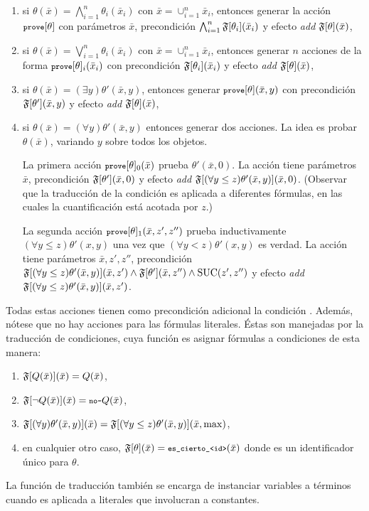 \begin{enumerate}[--]
\item si $\theta(\bar x)=\bigwedge_{i=1}^n \theta_i(\bar x_i)$
  con $\bar x=\cup_{i=1}^n \bar x_i$, entonces generar la acción
  ${\texttt{\footnotesize prove}}[\theta]$ con parámetros $\bar x$, precondición
  $\bigwedge_{i=1}^n \mathfrak{F}[\theta_i](\bar x_i)$ y efecto \textit{add}
  $\mathfrak{F}[\theta](\bar x)$,
%
\item si $\theta(\bar x)=\bigvee_{i=1}^n \theta_i(\bar x_i)$ con
  $\bar x=\cup_{i=1}^n \bar x_i$, entonces generar $n$ acciones de la forma
  ${\texttt{\footnotesize prove}}[\theta]_i(\bar x_i)$ con precondición
  $\mathfrak{F}[\theta_i](\bar x_i)$ y efecto \textit{add} $\mathfrak{F}[\theta](\bar x)$,
%
\item si $\theta(\bar x)=(\exists y)\theta'(\bar x,y)$, entonces generar
  ${\texttt{\footnotesize prove}}[\theta](\bar x,y)$ con precondición $\mathfrak{F}[\theta'](\bar x,y)$
  y efecto \textit{add} $\mathfrak{F}[\theta](\bar x)$,
%
\item si $\theta(\bar x)=(\forall y)\theta'(\bar x,y)$ entonces generar
  dos acciones. La idea es probar $\theta(\bar x)$, variando $y$
  sobre todos los objetos.

  La primera acción ${\texttt{\footnotesize prove}}[\theta]_0(\bar x)$ prueba $\theta'(\bar x,0)$.
  La acción tiene parámetros $\bar x$, precondición $\mathfrak{F}[\theta'](\bar x,0)$
  y efecto \textit{add} $\mathfrak{F}[(\forall y\leq z)\theta'(\bar x,y)](\bar x,0)$.
  (Observar que la traducción de la condición es aplicada a diferentes
fórmulas,
  en las cuales la cuantificación está acotada por $z$.)

  La segunda acción ${\texttt{\footnotesize prove}}[\theta]_1(\bar x,z',z'')$ prueba inductivamente
  $(\forall y\leq z)\theta'(x,y)$ una vez que $(\forall y<z)\theta'(x,y)$ es
verdad.
  La acción tiene parámetros $\bar x,z',z''$, precondición
  $\mathfrak{F}[(\forall y\leq z)\theta'(\bar x, y)](\bar x,z')\land\mathfrak{F}[\theta'](\bar x,z'')\land \text{SUC}(z',z'')$
  y efecto \textit{add} $\mathfrak{F}[(\forall y\leq z)\theta'(\bar x,y)](\bar x,z')$.
\end{enumerate}
Todas estas acciones tienen como precondición adicional la condición
. Además, nótese que no hay acciones para las fórmulas literales.
Éstas son manejadas por la traducción de condiciones, cuya función es asignar
fórmulas a condiciones de esta manera:
\begin{enumerate}[--]
\item $\mathfrak{F}[Q(\bar x)](\bar x)=Q(\bar x)$,
\item $\mathfrak{F}[\neg Q(\bar x)](\bar x)={\texttt{\footnotesize no-}}Q(\bar x)$,
\item $\mathfrak{F}[(\forall y)\theta'(\bar x,y)](\bar x) =
  \mathfrak{F}[(\forall y\leq z)\theta'(\bar x,y)](\bar x,\max)$,
\item en cualquier otro caso, $\mathfrak{F}[\theta](\bar x)={\texttt{\footnotesize es\_cierto\_<id>}}(\bar x)$
  donde  es un identificador único para $\theta$.
\end{enumerate}
La función de traducción también se encarga de instanciar variables a términos
cuando es aplicada a literales que involucran a constantes.

